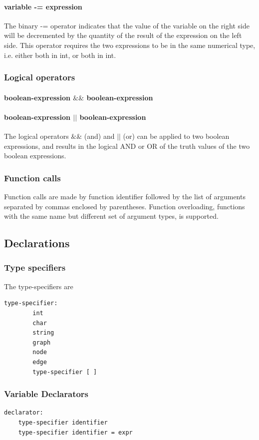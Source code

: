 \documentclass[a4paper,12pt]{article}
\begin{document}
\paragraph{variable -= expression}
The binary -= operator indicates that the value of the variable on the right side will be decremented by the quantity of the result of the expression on the left side. This operator requires the two expressions to be in the same numerical type, i.e. either both in int, or both in int.
\subsubsection{Logical operators}
\paragraph{boolean-expression $\&\&$ boolean-expression}
\paragraph{boolean-expression $||$ boolean-expression}
The logical operators $\&\&$ (and) and $||$ (or) can be applied to two boolean expressions, and results in the logical AND or OR of the truth values of the two boolean expressions.

\subsubsection{Function calls}
Function calls are made by function identifier followed by the list of arguments separated by commas enclosed by parentheses. Function overloading, functions with the same name but different set of argument types, is supported.

\subsection{Declarations}
\subsubsection{Type specifiers}
The type-specifiers are

\begin{lstlisting}
type-specifier:
		int
		char
		string
		graph
		node
		edge
		type-specifier [ ]
\end{lstlisting}
	
\subsubsection{Variable Declarators}
\begin{lstlisting}
declarator:
	type-specifier identifier
	type-specifier identifier = expr
\end{lstlisting}
	
\end{document}
